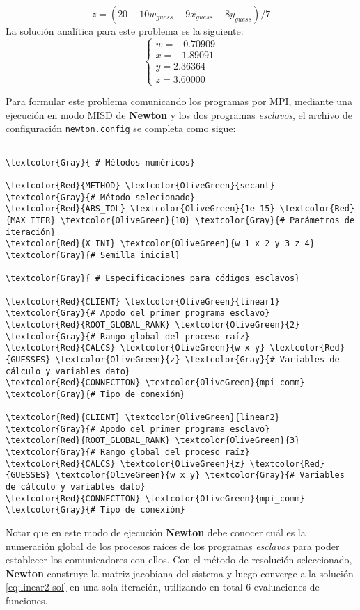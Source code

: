 \begin{equation}
 z = (20 - 10w_{guess} -  9x_{guess} - 8y_{guess})/ 7
 \label{eq:linear2b}
\end{equation}
La solución analítica para este problema es la siguiente:
\begin{equation}
\left\{\begin{matrix}
 w = -0.70909 \\
 x = -1.89091 \\
 y = 2.36364 \\
 z = 3.60000
\end{matrix}\right.
\label{eq:linear2-sol}
\end{equation}

Para formular este problema comunicando los programas por MPI,
mediante una ejecución en modo MISD de \textbf{Newton} y los dos programas \textit{esclavos},
el archivo de configuración \texttt{newton.config} se completa como sigue:

\begin{Verbatim}[frame=single,commandchars=\\\{\}]

\textcolor{Gray}{ # Métodos numéricos}

\textcolor{Red}{METHOD} \textcolor{OliveGreen}{secant} \textcolor{Gray}{# Método selecionado}
\textcolor{Red}{ABS_TOL} \textcolor{OliveGreen}{1e-15} \textcolor{Red}{MAX_ITER} \textcolor{OliveGreen}{10} \textcolor{Gray}{# Parámetros de iteración}
\textcolor{Red}{X_INI} \textcolor{OliveGreen}{w 1 x 2 y 3 z 4} \textcolor{Gray}{# Semilla inicial}

\textcolor{Gray}{ # Especificaciones para códigos esclavos}

\textcolor{Red}{CLIENT} \textcolor{OliveGreen}{linear1} \textcolor{Gray}{# Apodo del primer programa esclavo}
\textcolor{Red}{ROOT_GLOBAL_RANK} \textcolor{OliveGreen}{2} \textcolor{Gray}{# Rango global del proceso raíz}
\textcolor{Red}{CALCS} \textcolor{OliveGreen}{w x y} \textcolor{Red}{GUESSES} \textcolor{OliveGreen}{z} \textcolor{Gray}{# Variables de cálculo y variables dato}
\textcolor{Red}{CONNECTION} \textcolor{OliveGreen}{mpi_comm} \textcolor{Gray}{# Tipo de conexión}

\textcolor{Red}{CLIENT} \textcolor{OliveGreen}{linear2} \textcolor{Gray}{# Apodo del primer programa esclavo}
\textcolor{Red}{ROOT_GLOBAL_RANK} \textcolor{OliveGreen}{3}  \textcolor{Gray}{# Rango global del proceso raíz}
\textcolor{Red}{CALCS} \textcolor{OliveGreen}{z} \textcolor{Red}{GUESSES} \textcolor{OliveGreen}{w x y} \textcolor{Gray}{# Variables de cálculo y variables dato}
\textcolor{Red}{CONNECTION} \textcolor{OliveGreen}{mpi_comm} \textcolor{Gray}{# Tipo de conexión}

\end{Verbatim}

Notar que en este modo de ejecución \textbf{Newton} debe conocer 
cuál es la numeración global de los procesos raíces de los programas \textit{esclavos} para poder establecer los comunicadores con ellos.
Con el método de resolución seleccionado, \textbf{Newton} construye la matriz jacobiana del sistema y luego converge a la solución \ref{eq:linear2-sol} en una sola iteración,
utilizando en total  6 evaluaciones de funciones.
